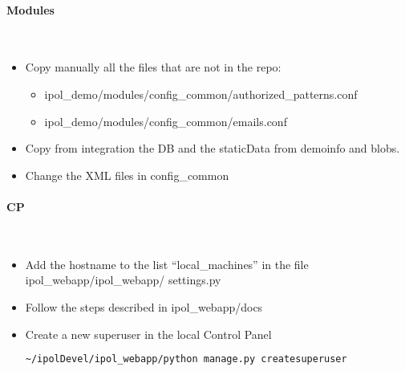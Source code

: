 \paragraph{Modules} \hspace{0pt} \\
\begin{itemize}
 \item Copy manually all the files that are not in the repo:
 
  \begin{itemize}
   \item ipol\_demo/modules/config\_common/authorized\_patterns.conf
   \item ipol\_demo/modules/config\_common/emails.conf
  \end{itemize}

 \item Copy from integration the DB and the staticData from demoinfo and blobs.
 \item Change the XML files in config\_common
\end{itemize}

\paragraph{CP} \hspace{0pt} \\
\begin{itemize}
 \item Add the hostname to the list ``local\_machines'' in the file ipol\_webapp/ipol\_webapp/ settings.py
 \item Follow the steps described in ipol\_webapp/docs
 \item Create a new superuser in the local Control Panel
  \begin{lstlisting}[language=Bash]
  ~/ipolDevel/ipol_webapp/python manage.py createsuperuser
  \end{lstlisting}
\end{itemize}